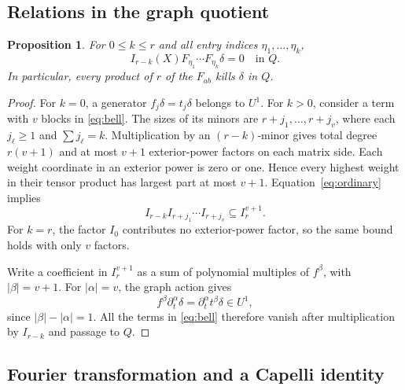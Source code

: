\documentclass[11pt,a4paper]{article}
\numberwithin{equation}{section}
\newtheorem{proposition}[theorem]{Proposition}
\theoremstyle{definition}
\begin{document}
\subsection{Relations in the graph quotient}\label{subsec:graphrelations}

\begin{proposition}\label{prop:graphrelations}
For $0\le k\le r$ and all entry indices $\eta_1,\ldots,\eta_k$,
\begin{equation}\label{eq:graphrelations}
I_{r-k}(X)F_{\eta_1}\cdots F_{\eta_k}\delta=0
\quad\text{in }Q.
\end{equation}
In particular, every product of $r$ of the $F_{ab}$ kills $\delta$ in $Q$.
\end{proposition}
\begin{proof}
For $k=0$, a generator $f_j\delta=t_j\delta$ belongs to $U^1$.
For $k>0$, consider a term with $v$ blocks in \eqref{eq:bell}. The
sizes of its minors are $r+j_1,\ldots,r+j_v$, where each $j_\ell\ge1$
and $\sum j_\ell=k$. Multiplication by an $(r-k)$-minor gives total
degree $r(v+1)$ and at most $v+1$ exterior-power factors on each
matrix side. Each weight coordinate in an exterior power is zero or
one. Hence every highest weight in their tensor product has largest
part at most $v+1$. Equation~\eqref{eq:ordinary} implies
\[
I_{r-k}I_{r+j_1}\cdots I_{r+j_v}\subseteq I_r^{v+1}.
\]
For $k=r$, the factor $I_0$ contributes no exterior-power factor,
so the same bound holds with only $v$ factors.

Write a coefficient in $I_r^{v+1}$ as a sum of polynomial multiples
of $f^\beta$, with $|\beta|=v+1$. For $|\alpha|=v$, the graph action gives
\[
f^\beta\partial_t^\alpha\delta
=\partial_t^\alpha t^\beta\delta\in U^1,
\]
since $|\beta|-|\alpha|=1$. All the terms in \eqref{eq:bell} therefore
vanish after multiplication by $I_{r-k}$ and passage to $Q$.
\end{proof}

\subsection{Fourier transformation and a Capelli identity}\label{subsec:capelli}
\end{document}
